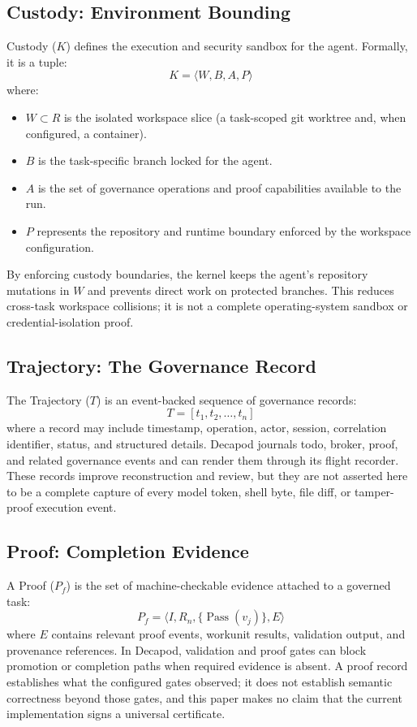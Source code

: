 \subsection{Custody: Environment Bounding}
Custody ($K$) defines the execution and security sandbox for the agent. Formally, it is a tuple:
$$K = \langle W, B, A, P \rangle$$
where:
\begin{itemize}
    \item $W \subset R$ is the isolated workspace slice (a task-scoped git worktree and, when configured, a container).
    \item $B$ is the task-specific branch locked for the agent.
    \item $A$ is the set of governance operations and proof capabilities available to the run.
    \item $P$ represents the repository and runtime boundary enforced by the workspace configuration.
\end{itemize}
By enforcing custody boundaries, the kernel keeps the agent's repository mutations in $W$ and prevents direct work on protected branches. This reduces cross-task workspace collisions; it is not a complete operating-system sandbox or credential-isolation proof.

\subsection{Trajectory: The Governance Record}
The Trajectory ($T$) is an event-backed sequence of governance records:
$$T = [t_1, t_2, \dots, t_n]$$
where a record may include timestamp, operation, actor, session, correlation identifier, status, and structured details. Decapod journals todo, broker, proof, and related governance events and can render them through its flight recorder. These records improve reconstruction and review, but they are not asserted here to be a complete capture of every model token, shell byte, file diff, or tamper-proof execution event.

\subsection{Proof: Completion Evidence}
A Proof ($P_f$) is the set of machine-checkable evidence attached to a governed task:
$$P_f = \langle I, R_n, \{\operatorname{Pass}(v_j)\}, E \rangle$$
where $E$ contains relevant proof events, workunit results, validation output, and provenance references. In Decapod, validation and proof gates can block promotion or completion paths when required evidence is absent. A proof record establishes what the configured gates observed; it does not establish semantic correctness beyond those gates, and this paper makes no claim that the current implementation signs a universal certificate.

